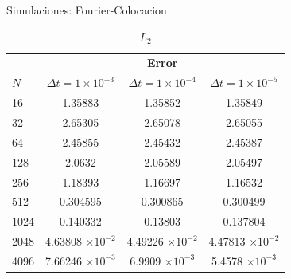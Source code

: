 \begin{frame}{Simulaciones: Fourier-Colocacion \hspace{2cm} \hyperlink{Navegador}{}}
	\begin{table}
    \centering
	\begin{tabular}{lccc}
		\toprule
		\multicolumn{1}{c}{}& \multicolumn{3}{c}{\textbf{Error}} \\
		$N$& $\Delta t=1\times 10^{-3}$& $\Delta t=1\times 10^{-4}$& $\Delta t=1\times 10^{-5}$ \\
		\midrule
		16& 1.35883& 1.35852& 1.35849 \\
		\midrule
		32& 2.65305& 2.65078& 2.65055 \\
		\midrule
		64& 2.45855& 2.45432& 2.45387 \\
		\midrule
		128& 2.0632& 2.05589& 2.05497 \\
		\midrule
		256& 1.18393& 1.16697& 1.16532 \\
		\midrule
		512& 0.304595& 0.300865& 0.300499 \\
		\midrule
		1024& 0.140332& 0.13803& 0.137804 \\
		\midrule
		2048& 4.63808 $\times 10^{-2}$& 4.49226 $\times 10^{-2}$& 4.47813 $\times 10^{-2}$ \\
		\midrule
		4096& 7.66246 $\times 10^{-3}$& 6.9909 $\times 10^{-3}$& 5.4578 $\times 10^{-3}$ \\
		\bottomrule
	\end{tabular}
	\caption{$L_2$}
\end{table}

\end{frame}
\label{Figuras-Estocastica}
